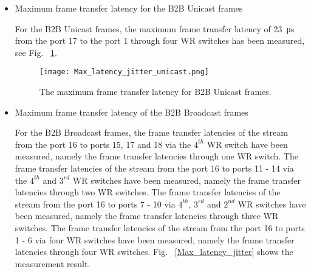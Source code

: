 \begin{itemize}
    \item Maximum frame transfer latency for the B2B Unicast frames

For the B2B Unicast frames, the maximum frame transfer latency of \SI{23}{\us} from the port 17 to the port 1 through four WR switches has been measured, see Fig. ~\ref{Max_latency_jitter_unicast}. 

%
%

\begin{figure}[H]
   \centering   
   \texttt{[image: Max\_latency\_jitter\_unicast.png]}
   \caption{The maximum frame transfer latency for B2B Unicast frames.}
   \label{Max_latency_jitter_unicast}
\end{figure}

    \item Maximum frame transfer latency of the B2B Broadcast frames

For the B2B Broadcast frames, the frame transfer latencies of the stream from the port 16 to ports 15, 17 and 18 via the $4^{th}$ WR switch have been measured, namely the frame transfer latencies through one WR switch. The frame transfer latencies of the stream from the port 16 to ports 11 - 14 via the $4^{th}$ and $3^{rd}$ WR switches have been measured, namely the frame transfer latencies through two WR switches. The frame transfer latencies of the stream from the port 16 to ports 7 - 10 via $4^{th}$, $3^{rd}$ and $2^{nd}$ WR switches have been measured, namely the frame transfer latencies through three WR switches. The frame transfer latencies of the stream from the port 16 to ports 1 - 6 via four WR switches have been measured, namely the frame transfer latencies through four WR switches. Fig. ~\ref{Max_latency_jitter} shows the measurement result.
  

\end{itemize}
